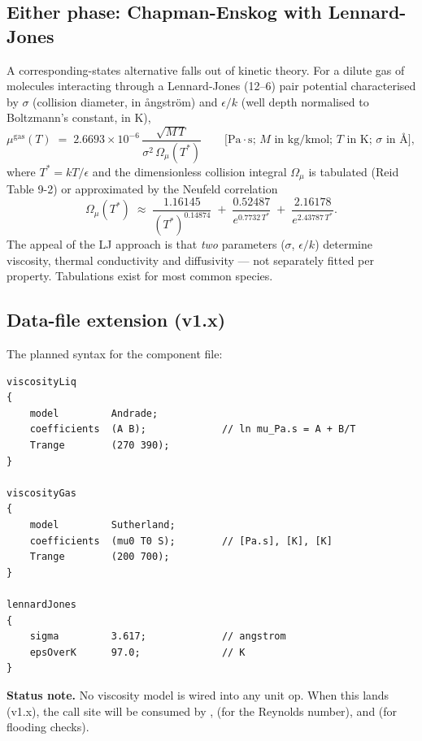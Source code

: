 \documentclass[11pt,a4paper]{article}
\begin{document}
\subsection{Either phase: Chapman-Enskog with Lennard-Jones}

A corresponding-states alternative falls out of kinetic theory.  For
a dilute gas of molecules interacting through a Lennard-Jones (12--6)
pair potential characterised by $\sigma$ (collision diameter, in
ångström) and $\epsilon / k$ (well depth normalised to Boltzmann's
constant, in K),
\begin{equation}
   \mu^{\mathrm{gas}}(T) \;=\;
     2.6693 \times 10^{-6}\,
     \frac{\sqrt{M\,T}}{\sigma^{2}\,\Omega_{\!\mu}(T^*)}
     \qquad \text{[Pa$\cdot$s; $M$ in kg/kmol; $T$ in K; $\sigma$ in Å]},
   \label{eq:chapman-enskog}
\end{equation}
where $T^* = kT / \epsilon$ and the dimensionless collision integral
$\Omega_{\!\mu}$ is tabulated (Reid Table 9-2) or approximated by the
Neufeld correlation
\begin{equation}
   \Omega_{\!\mu}(T^*) \;\approx\; \frac{1.16145}{(T^*)^{0.14874}}
     \;+\; \frac{0.52487}{e^{0.7732\,T^*}}
     \;+\; \frac{2.16178}{e^{2.43787\,T^*}}.
\end{equation}
The appeal of the LJ approach is that \emph{two} parameters
($\sigma$, $\epsilon/k$) determine viscosity, thermal conductivity
and diffusivity --- not separately fitted per property.  Tabulations
exist for most common species.

\subsection{Data-file extension (v1.x)}

The planned syntax for the component file:
\begin{lstlisting}
viscosityLiq
{
    model         Andrade;
    coefficients  (A B);             // ln mu_Pa.s = A + B/T
    Trange        (270 390);
}

viscosityGas
{
    model         Sutherland;
    coefficients  (mu0 T0 S);        // [Pa.s], [K], [K]
    Trange        (200 700);
}

lennardJones
{
    sigma         3.617;             // angstrom
    epsOverK      97.0;              // K
}
\end{lstlisting}

\begin{tutoriallink}
\textbf{Status note.}  No viscosity model is wired into any unit
op.  When this lands (v1.x), the call site will be
 consumed by
,  (for the Reynolds number), and
 (for flooding checks).
\end{tutoriallink}
\end{document}

